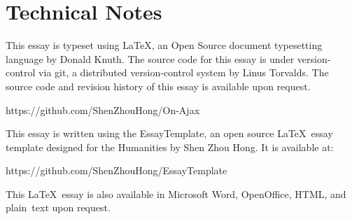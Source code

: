 
\section*{Technical Notes}
This essay is typeset using \LaTeX, an Open Source document typesetting language
by Donald Knuth. The source code for this essay is under version-control via
git, a distributed version-control system by Linus Torvalds. The source code
and revision history of this essay is available upon request.

https://github.com/ShenZhouHong/On-Ajax

\noindent
This essay is written using the EssayTemplate, an open source \LaTeX\ essay
template designed for the Humanities by Shen Zhou Hong. It is available at:

https://github.com/ShenZhouHong/EssayTemplate

\vfill
\begin{center}
This \LaTeX\ essay is also available in Microsoft Word, OpenOffice, HTML, and \mbox{plain text} upon request.
\end{center}
